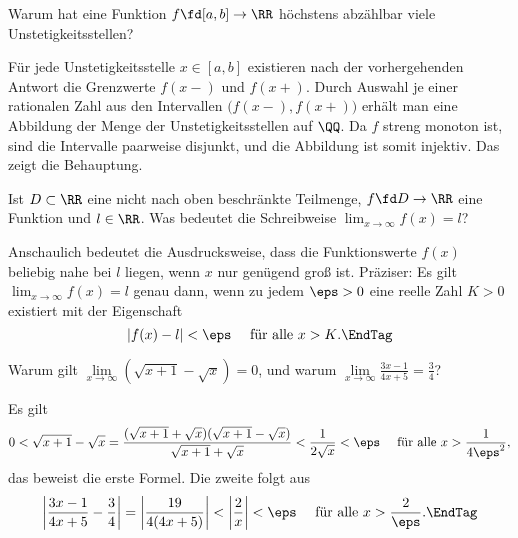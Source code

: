 \begin{frage}
  Warum hat eine  Funktion $f\fd [a,b]\to \RR$ 
  höchstens abzählbar viele Unstetigkeitsstellen?
\end{frage}

\begin{antwort}
  Für jede Unstetigkeitsstelle $x\in [a,b]$ existieren nach der vorhergehenden 
  Antwort die Grenzwerte $f(x-)$ und $f(x+)$. 
  Durch Auswahl je einer rationalen Zahl aus den Intervallen 
  $\big( f(x-),f(x+) \big)$ erhält man eine Abbildung der Menge der 
  Unstetigkeitsstellen auf $\QQ$. Da $f$ streng monoton ist, sind 
  die Intervalle paarweise disjunkt, und die Abbildung ist somit injektiv. 
  Das zeigt die Behauptung. \AntEnd
\end{antwort}

\begin{frage}
  Ist $D\subset \RR$ eine nicht nach oben beschränkte Teilmenge,  
  $f\fd D\to \RR$ eine Funktion und 
  $l\in\RR$. 
  Was bedeutet die Schreibweise $\lim_{x\to\infty} f(x)=l$?
\end{frage}

\begin{antwort}
  Anschaulich bedeutet die Ausdrucksweise, dass die Funktionswerte $f(x)$ 
  beliebig nahe bei $l$ liegen, wenn $x$ nur genügend groß 
  ist. Präziser: 
  Es gilt $\lim_{x\to\infty} f(x)=l$ genau dann, wenn 
  zu jedem $\eps>0$ eine reelle Zahl $K > 0$ existiert mit der Eigenschaft
  \begin{equation}
    | f(x)-l | < \eps \quad\text{ für alle $x>K$.} \EndTag
  \end{equation}
  
\end{antwort}

\begin{frage}\label{03_gbsp}
  Warum gilt 
  $\lim\limits_{x\to\infty} ( \sqrt{x+1} - \sqrt{x})=0 $, und warum 
  $\lim\limits_{x\to\infty}  \frac{3x-1}{4x+5}=\frac{3}{4}$?
\end{frage}

\begin{antwort}
  Es gilt
  \[
  0<\sqrt{x+1}-\sqrt{x} = 
  \frac{(\sqrt{x+1}+\sqrt{x})(\sqrt{x+1}-\sqrt{x})}{\sqrt{x+1}+\sqrt{x}}
  < \frac{1}{2\sqrt{x}} < \eps \quad\text{ für alle $x>\frac{1}{4\eps^2}$}, 
  \]
  das beweist die erste Formel. Die zweite folgt aus 
  \begin{equation}
    \left| \frac{3x-1}{4x+5}-\frac{3}{4} \right| = 
    \left| \frac{ 19 }{4(4x+5)} \right| < \left| \frac{2}{x} \right| < \eps 
    \quad\text{ für alle $x>\frac{2}{\eps}$.}
    \EndTag
  \end{equation}
\end{antwort} 

